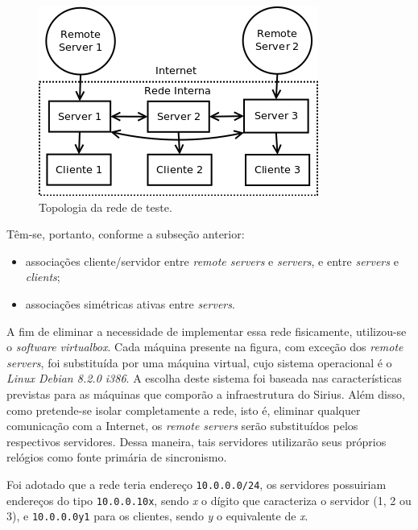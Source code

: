 \FloatBarrier

\begin{figure}[h]
    
    \centering
    \includegraphics[scale=0.7]{image/rede_ntp_teste}
    \caption {Topologia da rede de teste.}
    \label{fig:redeNTP} 
\end{figure} 

\FloatBarrier

Têm-se, portanto, conforme a subseção anterior:

\begin{itemize}
  \renewcommand\labelitemi{--}
  \item associações cliente/servidor entre \textit{remote servers} e
  \textit{servers}, e entre \textit{servers} e \textit{clients};
  \item associações simétricas ativas entre \textit{servers}.
\end{itemize}

A fim de eliminar a necessidade de implementar essa rede fisicamente,
utilizou-se o \textit{software virtualbox}. Cada máquina presente na figura, com
exceção dos \textit{remote servers}, foi substituída por uma máquina virtual,
cujo sistema operacional é o \textit{Linux Debian 8.2.0 i386}. A escolha deste
sistema foi baseada nas características previstas para as máquinas que comporão
a infraestrutura do Sirius. Além disso, como pretende-se isolar completamente a
rede, isto é, eliminar qualquer comunicação com a Internet, os \textit{remote
servers} serão substituídos pelos respectivos servidores. Dessa maneira, tais
servidores utilizarão seus próprios relógios como fonte primária de sincronismo.

\vspace{12pt}

Foi adotado que a rede teria endereço \texttt{10.0.0.0/24}, os servidores
possuiriam endereços do tipo \texttt{10.0.0.10x}, sendo \textit{x} o dígito que
caracteriza o servidor (1, 2 ou 3), e \texttt{10.0.0.0y1} para os clientes,
sendo \textit{y} o equivalente de \textit{x}. 


